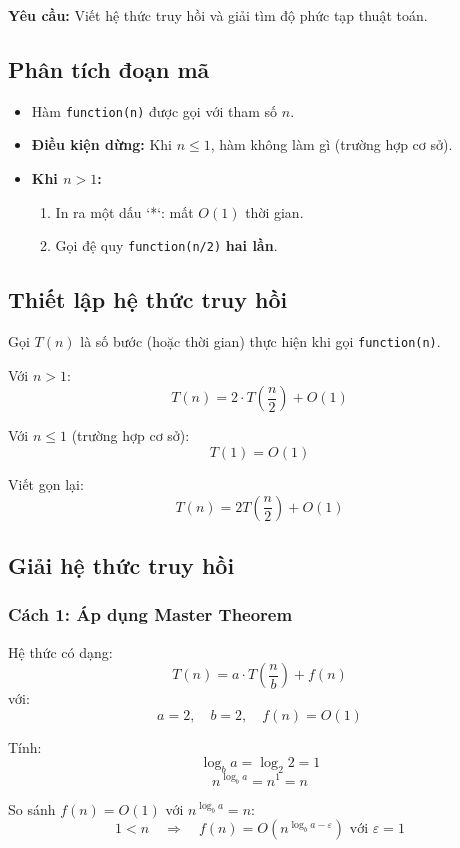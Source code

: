 \documentclass{article}
\begin{document}
\textbf{Yêu cầu:} Viết hệ thức truy hồi và giải tìm độ phức tạp thuật toán.

\subsection{Phân tích đoạn mã}

\begin{itemize}
    \item Hàm \texttt{function(n)} được gọi với tham số \(n\).
    \item \textbf{Điều kiện dừng:} Khi \(n \le 1\), hàm không làm gì (trường hợp cơ sở).
    \item \textbf{Khi \(n > 1\):}
    \begin{enumerate}
        \item In ra một dấu `*`: mất \(O(1)\) thời gian.
        \item Gọi đệ quy \texttt{function(n/2)} \textbf{hai lần}.
    \end{enumerate}
\end{itemize}

\subsection{Thiết lập hệ thức truy hồi}

Gọi \(T(n)\) là số bước (hoặc thời gian) thực hiện khi gọi \texttt{function(n)}.

Với \(n > 1\):
\[
T(n) = 2 \cdot T\left(\frac{n}{2}\right) + O(1)
\]

Với \(n \le 1\) (trường hợp cơ sở):
\[
T(1) = O(1)
\]

Viết gọn lại:
\[
\boxed{T(n) = 2T\left(\frac{n}{2}\right) + O(1)}
\]

\subsection{Giải hệ thức truy hồi}

\subsubsection{Cách 1: Áp dụng Master Theorem}

Hệ thức có dạng:
\[
T(n) = a \cdot T\left(\frac{n}{b}\right) + f(n)
\]
với:
\[
a = 2,\quad b = 2,\quad f(n) = O(1)
\]

Tính:
\[
\log_b a = \log_2 2 = 1
\]
\[
n^{\log_b a} = n^1 = n
\]

So sánh \(f(n) = O(1)\) với \(n^{\log_b a} = n\):
\[
1 < n \quad \Rightarrow \quad f(n) = O\left(n^{\log_b a - \varepsilon}\right) \text{ với } \varepsilon = 1
\]
\end{document}

